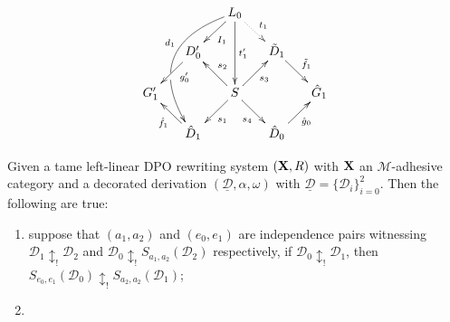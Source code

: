 \documentclass[a4paper,UKenglish,cleveref,pdftex, thm-restate,numberwithinsect]{lipics}
\def\R{\mathsf{R}}
\def\X{\textbf {\textup{X}}}
\newcommand{\dder}[1]{\mathscr{#1}}
\newcommand{\der}[1]{\underline{\dder{#1}}}
\begin{document}
{\[\xymatrix@R=15pt@C=15pt{&&L_ 0\ar[dl]^{I_1} \ar@/_1.2cm/[dddl]_(.4){d_1}|(.63)\hole\ar[dd]^{t'_1} \ar@{.>}[dr]^{t_1}\\&D'_0 \ar[dl]^(.4){g'_0}&&\tilde{D}_1 \ar[dr]^{\tilde{f}_1}\\G'_1 && S\ar[dr]_{s_4} \ar[ur]_{s_3}\ar[dl]^{s_1} \ar[ul]_{s_2}&&\hat{G}_1\\& \hat{D}_1 \ar[ul]^{\hat{f}_1}&&\hat{D}_0 \ar[ur]_{\hat{g}_0}}\]



}


\newpage 
\iffalse 
\begin{corollary} Given a tame  left-linear DPO rewriting system  $(\X,\R)$ with $\X$ an $\mathcal{M}$-adhesive category and a decorated derivation $(\der{D}, \alpha, \omega)$ with $\der{D}=\{\dder{D}_i\}_{i=0}^2$. Then the following are true: 
	\begin{enumerate}
		\item suppose that $(a_1,a_2)$ and $(e_0,e_1)$ are independence pairs witnessing  $\dder{D}_1\updownarrow_! \dder{D}_2$ and $\dder{D}_0\updownarrow_! S_{a_1,a_2}(\dder{D}_2)$ respectively, if $\dder{D}_0\updownarrow_!\dder{D}_1$, then $S_{e_0,e_1}(\dder{D}_0)\updownarrow_!S_{a_2,a_2}(\dder{D}_1)$;
		\item 
	\end{enumerate}
\end{corollary}
\end{document}
